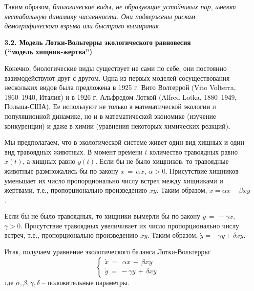 \documentclass[12pt,a4paper]{article}
\begin{document}
Таким образом, {\em биологические виды, не образующие устойчивых пар, имеют нестабильную динамику численности.
Они подвержены рискам демографического взрыва или быстрого вымирания.}
\bigskip

\begin{center}
\textbf{3.2. Модель Лотки-Вольтерры экологического равновесия \\
(``модель хищник-жертва'')}
\end{center}
\medskip

Конечно, биологические виды существует не сами по себе, они постоянно взаимодействуют друг с другом.
Одна из первых моделей сосуществования  нескольких видов была предложена в 1925 г. Вито Волтеррой (Vito Volterra, 1860--1940, Италия) и в 1926 г.
Альфредом Лоткой (Alfred Lotka, 1880--1949, Польша-США). Ее используют не только в математической экологии и
популяционной динамике, но и в математической экономике (изучение конкуренции) и даже в химии
(уравнения некоторых химических реакций).

Мы предполагаем, что в экологической системе живет один вид хищных и один вид травоядных животных.
В момент времени $t$ количество травоядных равно $x(t)$, а хищных равно $y(t)$.
Если бы не было хищников, то травоядные животные размножались бы по закону
$\dot x \, = \, \alpha x$, $\alpha > 0$. Присутствие хищников уменьшает их число пропорционально
числу встреч между хищниками и жертвами, т.е., пропорционально произведению $xy$.
Таким образом, $\dot x = \alpha x - \beta xy$.

Если бы не было травоядных, то хищники вымерли бы по закону
$\dot y \, = \, - \gamma x$, $\gamma > 0$. Присутствие травоядных  увеличивает их число пропорционально
числу встреч, т.е., пропорционально произведению $xy$.
Таким образом, $\dot y = - \gamma y + \delta xy$.

Итак, получаем уравнение экологического баланса Лотки-Вольтерры:
\begin{equation}\label{eq.lv}
\left\{
\begin{array}{l}
\dot x \ = \ \ \alpha x \, - \, \beta xy\\
\dot y \ = \ - \gamma y \, + \, \delta xy
\end{array}
\right.
\end{equation}
где $\alpha, \beta, \gamma, \delta$ -- положительные параметры.
\end{document}
